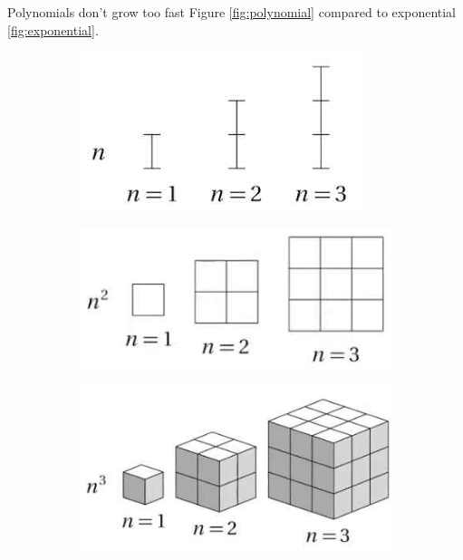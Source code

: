 \documentclass[]{article}
\begin{document}
Polynomials don't grow too fast Figure \ref{fig:polynomial} compared to exponential \ref{fig:exponential}.
\begin{figure}[H]
	\caption{Polynomials don't grow too fast}\label{fig:polynomial} 
	\begin{subfigure}[t]{0.3\textwidth}
		\caption{}
		\includegraphics[width=\textwidth]{n1}
	\end{subfigure}
	\begin{subfigure}[t]{0.3\textwidth}
		\caption{}
		\includegraphics[width=\textwidth]{n2}
	\end{subfigure}
	\begin{subfigure}[t]{0.3\textwidth}
		\caption{}
		\includegraphics[width=\textwidth]{n3}
	\end{subfigure}
\end{figure}
\end{document}
